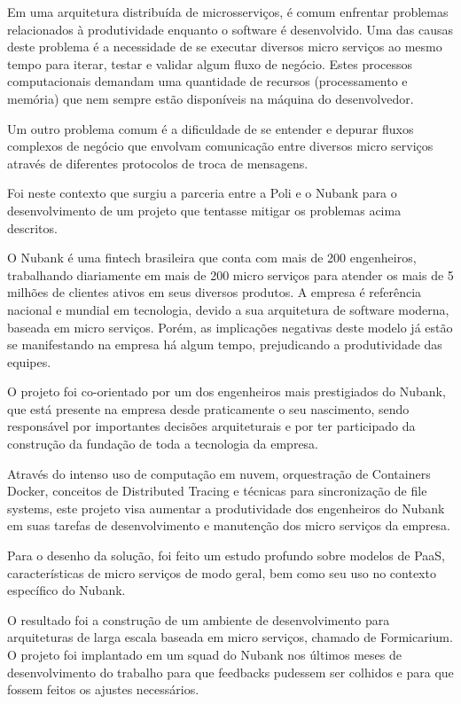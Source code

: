 \documentclass[]{politex}
\begin{document}
\begin{resumo}
	Em uma arquitetura distribuída de microsserviços, é comum enfrentar problemas relacionados à produtividade enquanto o software é desenvolvido. Uma das causas deste problema é a necessidade de se executar diversos micro serviços ao mesmo tempo para iterar, testar e validar algum fluxo de negócio. Estes processos computacionais demandam uma quantidade de recursos (processamento e memória) que nem sempre estão disponíveis na máquina do desenvolvedor.
	
	Um outro problema comum é a dificuldade de se entender e depurar fluxos complexos de negócio que envolvam comunicação entre diversos micro serviços através de diferentes protocolos de troca de mensagens.
	
	Foi neste contexto que surgiu a parceria entre a Poli e o Nubank para o desenvolvimento de um projeto que tentasse mitigar os problemas acima descritos.
	
	O Nubank é uma fintech brasileira que conta com mais de 200 engenheiros, trabalhando diariamente em mais de 200 micro serviços para atender os mais de 5 milhões de clientes ativos em seus diversos produtos. A empresa é referência nacional e mundial em tecnologia, devido a sua arquitetura de software moderna, baseada em micro serviços. Porém, as implicações negativas deste modelo já estão se manifestando na empresa há algum tempo, prejudicando a produtividade das equipes.
	
	O projeto foi co-orientado por um dos engenheiros mais prestigiados do Nubank, que está presente na empresa desde praticamente o seu nascimento, sendo responsável por importantes decisões arquiteturais e por ter participado da construção da fundação de toda a tecnologia da empresa.
	
	Através do intenso uso de computação em nuvem, orquestração de Containers Docker, conceitos de Distributed Tracing e técnicas para sincronização de file systems, este projeto visa aumentar a produtividade dos engenheiros do Nubank em suas tarefas de desenvolvimento e manutenção dos micro serviços da empresa.
	
	Para o desenho da solução, foi feito um estudo profundo sobre modelos de PaaS, características de micro serviços de modo geral, bem como seu uso no contexto específico do Nubank. 
	
	O resultado foi a construção de um ambiente de desenvolvimento para arquiteturas de larga escala baseada em micro serviços, chamado de Formicarium. O projeto foi implantado em um squad do Nubank nos últimos meses de desenvolvimento do trabalho para que feedbacks pudessem ser colhidos e para que fossem feitos os ajustes necessários.
	

\end{resumo}
\end{document}
